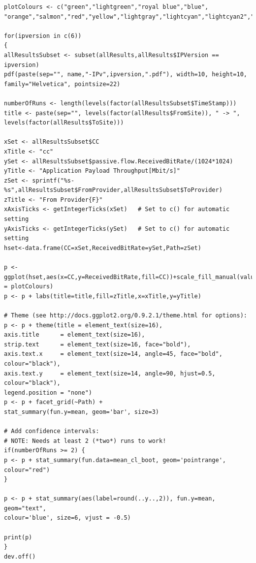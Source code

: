 \documentclass[a4paper,12pt]{ctexbook}
\begin{document}
\begin{flushleft}
\begin{verbatim}
plotColours <- c("green","lightgreen","royal blue","blue", "orange","salmon","red","yellow","lightgray","lightcyan","lightcyan2","lightcyan3","lightcyan4","orchid","orchid1","orchid2","orchid3","orchid4")

for(ipversion in c(6))
{
allResultsSubset <- subset(allResults,allResults$IPVersion == ipversion)
pdf(paste(sep="", name,"-IPv",ipversion,".pdf"), width=10, height=10, family="Helvetica", pointsize=22)

numberOfRuns <- length(levels(factor(allResultsSubset$TimeStamp)))
title <- paste(sep="", levels(factor(allResults$FromSite)), " -> ", levels(factor(allResults$ToSite)))

xSet <- allResultsSubset$CC
xTitle <- "cc"
ySet <- allResultsSubset$passive.flow.ReceivedBitRate/(1024*1024)
yTitle <- "Application Payload Throughput[Mbit/s]"
zSet <- sprintf("%s-%s",allResultsSubset$FromProvider,allResultsSubset$ToProvider)
zTitle <- "From Provider{F}"
xAxisTicks <- getIntegerTicks(xSet)   # Set to c() for automatic setting
yAxisTicks <- getIntegerTicks(ySet)   # Set to c() for automatic setting
hset<-data.frame(CC=xSet,ReceivedBitRate=ySet,Path=zSet)

p <- ggplot(hset,aes(x=CC,y=ReceivedBitRate,fill=CC))+scale_fill_manual(values = plotColours)
p <- p + labs(title=title,fill=zTitle,x=xTitle,y=yTitle)

# Theme (see http://docs.ggplot2.org/0.9.2.1/theme.html for options):
p <- p + theme(title = element_text(size=16),
axis.title      = element_text(size=16),
strip.text      = element_text(size=16, face="bold"),
axis.text.x     = element_text(size=14, angle=45, face="bold", colour="black"),
axis.text.y     = element_text(size=14, angle=90, hjust=0.5, colour="black"),
legend.position = "none")
p <- p + facet_grid(~Path) + 
stat_summary(fun.y=mean, geom='bar', size=3)

# Add confidence intervals:
# NOTE: Needs at least 2 (*two*) runs to work!
if(numberOfRuns >= 2) {
p <- p + stat_summary(fun.data=mean_cl_boot, geom='pointrange', colour="red")
}

p <- p + stat_summary(aes(label=round(..y..,2)), fun.y=mean, geom="text",
colour='blue', size=6, vjust = -0.5)

print(p)
}
dev.off()
\end{verbatim}

\newpage

\end{flushleft}
\end{document}
